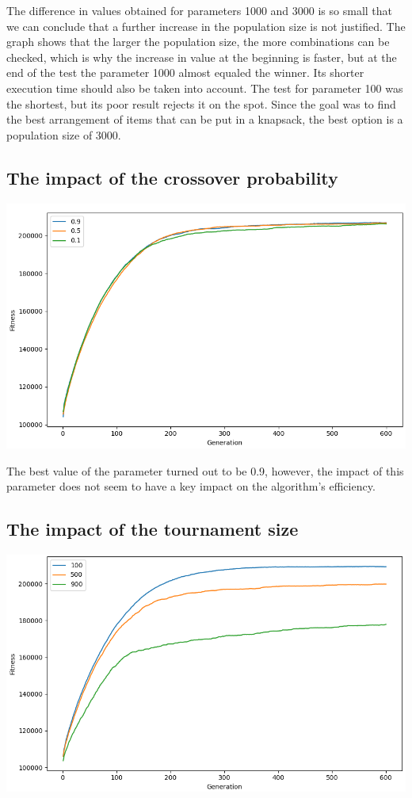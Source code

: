\documentclass[12pt]{article}
\begin{document}
The difference in values obtained for parameters 1000 and 3000 is so small that we can conclude that a further increase in the population size is not justified. The graph shows that the larger the population size, the more combinations can be checked, which is why the increase in value at the beginning is faster, but at the end of the test the parameter 1000 almost equaled the winner. Its shorter execution time should also be taken into account. The test for parameter 100 was the shortest, but its poor result rejects it on the spot. Since the goal was to find the best arrangement of items that can be put in a knapsack, the best option is a population size of 3000.

\subsection{The impact of the crossover probability}
\hspace*{-1.5cm}
\includegraphics[scale=0.5]{crossover}

The best value of the parameter turned out to be 0.9, however, the impact of this parameter does not seem to have a key impact on the algorithm's efficiency.

\subsection{The impact of the tournament size}
\hspace*{-1.5cm}
\includegraphics[scale=0.55]{tournament}
\end{document}
